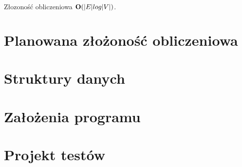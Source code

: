 \documentclass[a4paper, 10pt]{article}
\begin{document}
Złozoność obliczeniowa ${\bf O}(|E| log |V|)$.

\FloatBarrier

\section{Planowana złożoność obliczeniowa}

\section{Struktury danych}
\section{Założenia programu}
\section{Projekt testów}
	
	





\nocite{*}

\end{document}
